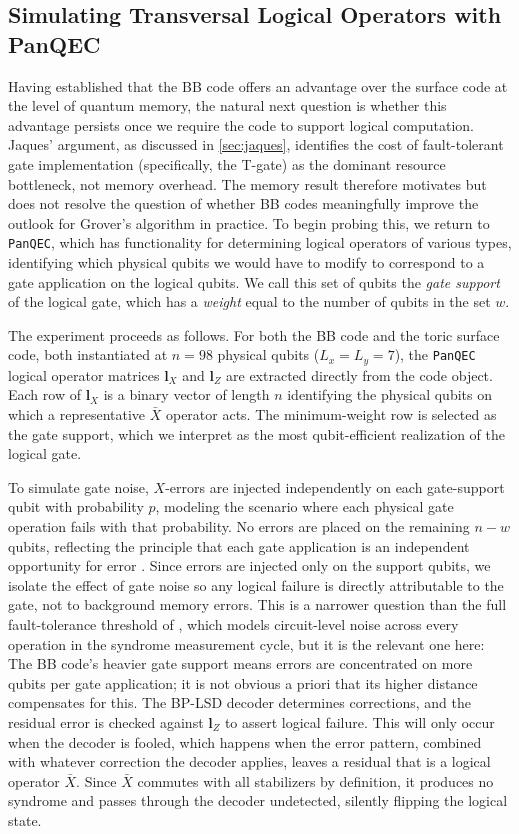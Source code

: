 \subsection{Simulating Transversal Logical Operators with PanQEC}\label{sec:panqec_gates}
Having established that the BB code offers an advantage over the surface code at the level of quantum memory, the natural next question is whether this advantage persists once we require the code to support logical computation. Jaques' argument, as discussed in \cref{sec:jaques}, identifies the cost of fault-tolerant gate implementation (specifically, the T-gate) as the dominant resource bottleneck, not memory overhead. The memory result therefore motivates but does not resolve the question of whether BB codes meaningfully improve the outlook for Grover's algorithm in practice. To begin probing this, we return to \texttt{PanQEC}, which has functionality for determining logical operators of various types, identifying which physical qubits we would have to modify to correspond to a gate application on the logical qubits. We call this set of qubits the \emph{gate support} of the logical gate, which has a \emph{weight} equal to the number of qubits in the set $w$.

The experiment proceeds as follows. For both the BB code and the toric surface code, both instantiated at $n = 98$ physical qubits ($L_x = L_y = 7$), the \texttt{PanQEC} logical operator matrices $\mathbf{l}_X$ and $\mathbf{l}_Z$ are extracted directly from the %
code object. Each row of $\mathbf{l}_X$ is a binary vector of length $n$ identifying the physical qubits on which a representative $\bar{X}$ operator acts. The minimum-weight row is selected as the gate support, which we interpret as the most qubit-efficient realization of the logical gate.

To simulate gate noise, $X$-errors are injected independently on each gate-support qubit with probability $p$, modeling the scenario where each physical gate operation fails with that probability. No errors are placed on the remaining $n - w$ qubits, reflecting the principle that each gate application is an independent opportunity for error \cite{Nielsen_Chuang_2010}. Since errors are injected only on the support qubits, we isolate the effect of gate noise so any logical failure is directly attributable to the gate, not to background memory errors. 
This is a narrower question than the full fault-tolerance threshold of \textcite{Bravyi2024}, which models circuit-level noise across every operation in the syndrome measurement cycle, but it is the relevant one here: The BB code's heavier gate support means errors are concentrated on more qubits per gate application; it is not obvious a priori that its higher distance compensates for this.
The BP-LSD decoder determines corrections, and the residual error is checked against $\mathbf{l}_Z$ to assert logical failure. This will only occur when the decoder is fooled, which happens when the error pattern, combined with whatever correction the decoder applies, leaves a residual that is a logical operator $\bar{X}$. Since $\bar{X}$ commutes with all stabilizers by definition, it produces no syndrome and passes through the decoder undetected, silently flipping the logical state.

